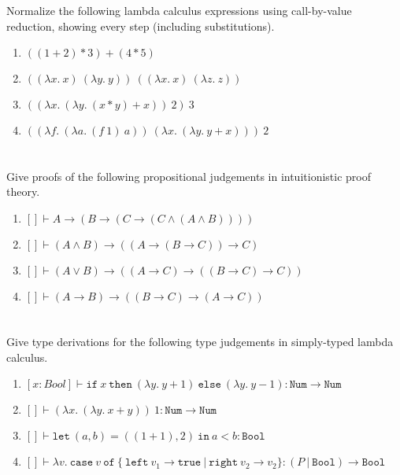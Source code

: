\documentclass[12pt]{article}
\begin{document}
\section{}
Normalize the following lambda calculus expressions using call-by-value reduction, showing every step (including substitutions).

\begin{enumerate}[label=\alph*)]
  \item $((1 + 2) * 3) + (4 * 5)$
  \item $((\lambda x.\ x)\ (\lambda y.\ y))\ ((\lambda x.\ x)\ (\lambda z.\ z))$
  \item $((\lambda x.\ (\lambda y.\ (x * y) + x))\ 2)\ 3$
  \item $((\lambda f.\ (\lambda a.\ (f\ 1)\ a))\ (\lambda x.\ (\lambda y.\ y + x)))\ 2$
\end{enumerate}


\section{}
Give proofs of the following propositional judgements in intuitionistic proof theory.

\begin{enumerate}[label=\alph*)]
  \item $[] \vdash A \to (B \to (C \to (C \wedge (A \wedge B))))$
  \item $[] \vdash (A \wedge B) \to ((A \to (B \to C)) \to C)$
  \item $[] \vdash (A \vee B) \to ((A \to C) \to ((B \to C) \to C))$
  \item $[] \vdash (A \to B) \to ((B \to C) \to (A \to C))$
\end{enumerate}


\section{}
Give type derivations for the following type judgements in simply-typed lambda calculus.

\begin{enumerate}[label=\alph*)]
  \item $[x : Bool] \vdash \texttt{if}\ x\ \texttt{then}\ (\lambda y.\ y + 1)\ \texttt{else}\ (\lambda y.\ y - 1) : \texttt{Num} \to \texttt{Num}$
  \item $[] \vdash (\lambda x.\ (\lambda y.\ x + y))\ 1 : \texttt{Num} \to \texttt{Num}$
  \item $[] \vdash \texttt{let}\ (a, b) = ((1 + 1), 2)\ \texttt{in}\ a < b : \texttt{Bool}$
  \item $[] \vdash \lambda v.\ \texttt{case}\ v\ \texttt{of}\ \{\ \texttt{left}\ v_1 \to \texttt{true}\ |\ \texttt{right}\ v_2 \to v_2 \} : (P\ |\ \texttt{Bool}) \to \texttt{Bool}$
\end{enumerate}
\end{document}
